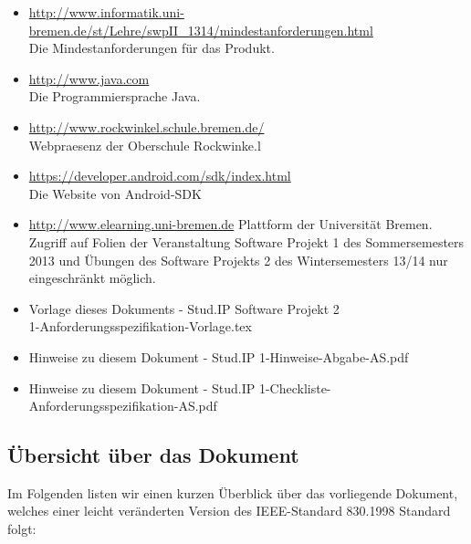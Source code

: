 \documentclass[fontsize=12pt,paper=a4,twoside]{scrartcl}
\begin{document}
\begin{itemize}

\item{\url{http://www.informatik.uni-bremen.de/st/Lehre/swpII_1314/mindestanforderungen.html}\\ Die Mindestanforderungen für das Produkt.}

\item{\url{http://www.java.com}\\ Die Programmiersprache Java.}

\item{\url{http://www.rockwinkel.schule.bremen.de/}\\ Webpraesenz der Oberschule Rockwinke.l}

 \item{\url{https://developer.android.com/sdk/index.html}\\ Die Website von Android-SDK}

\item{\url{http://www.elearning.uni-bremen.de} Plattform der Universität Bremen. Zugriff auf Folien der Veranstaltung Software Projekt 1 des Sommersemesters 2013 und Übungen des Software Projekts 2 des Wintersemesters 13/14 nur eingeschränkt möglich.}

\item{Vorlage dieses Dokuments - Stud.IP Software Projekt 2\\ 1-Anforderungsspezifikation-Vorlage.tex}

\item{Hinweise zu diesem Dokument - Stud.IP 1-Hinweise-Abgabe-AS.pdf}

\item{Hinweise zu diesem Dokument - Stud.IP 1-Checkliste-Anforderungsspezifikation-AS.pdf}

\end{itemize}

\subsection{Übersicht über das Dokument}
Im Folgenden listen wir einen kurzen Überblick über das vorliegende Dokument, welches einer leicht veränderten Version des IEEE-Standard 830.1998 Standard folgt:
\end{document}
